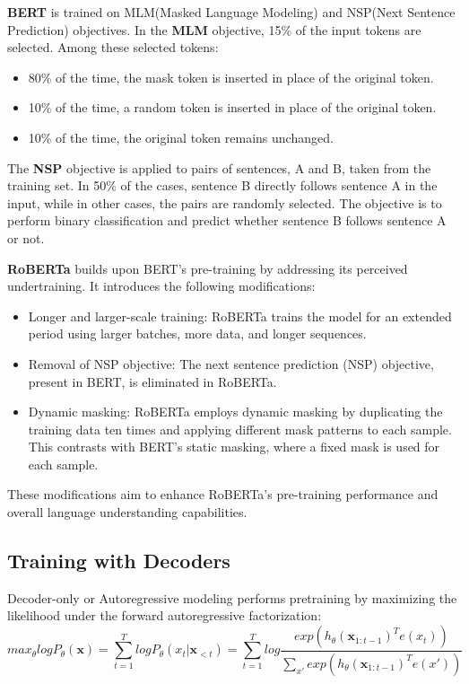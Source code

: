 \textbf{BERT} \cite{devlin2018bert} is trained on MLM(Masked Language Modeling) and NSP(Next Sentence Prediction) objectives.
In the \textbf{MLM} objective, 15\% of the input tokens are selected. Among these selected tokens:
\begin{itemize}
    \item 80\% of the time, the mask token is inserted in place of the original token.
    \item 10\% of the time, a random token is inserted in place of the original token.
    \item 10\% of the time, the original token remains unchanged.
\end{itemize}
The \textbf{NSP} objective is applied to pairs of sentences, A and B, taken from the training set. In 50\% of the cases, sentence B directly follows sentence A in the input, while in other cases, the pairs are randomly selected. The objective is to perform binary classification and predict whether sentence B follows sentence A or not.

\textbf{RoBERTa} \cite{liu2019roberta} builds upon BERT's pre-training by addressing its perceived undertraining. It introduces the following modifications:
\begin{itemize}
    \item Longer and larger-scale training: RoBERTa trains the model for an extended period using larger batches, more data, and longer sequences.
    \item Removal of NSP objective: The next sentence prediction (NSP) objective, present in BERT, is eliminated in RoBERTa.
    \item Dynamic masking: RoBERTa employs dynamic masking by duplicating the training data ten times and applying different mask patterns to each sample. This contrasts with BERT's static masking, where a fixed mask is used for each sample.
\end{itemize}
These modifications aim to enhance RoBERTa's pre-training performance and overall language understanding capabilities.




\subsection{Training with Decoders}
Decoder-only or Autoregressive modeling performs
pretraining by maximizing the likelihood under the forward autoregressive factorization:
$$
max_{\theta}logP_{\theta}(\textbf{x})=\sum_{t=1}^TlogP_{\theta}(x_t|\textbf{x}_{<t})
= \sum_{t=1}^T{log\frac{exp(h_{\theta}(\textbf{x}_{1:t-1})^Te(x_t))}{\sum_{x\prime}exp(h_{\theta}(\textbf{x}_{1:t-1})^Te(x\prime))}}
$$

